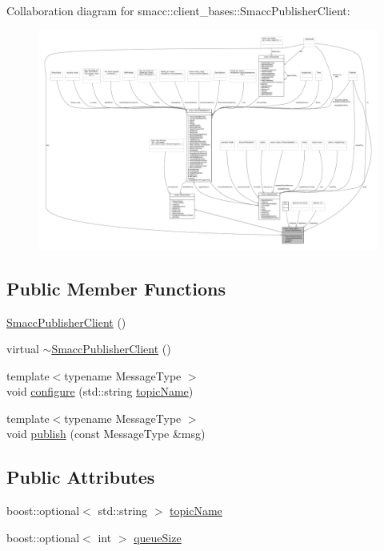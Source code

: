 Collaboration diagram for smacc\+:\+:client\+\_\+bases\+:\+:Smacc\+Publisher\+Client\+:\nopagebreak
\begin{figure}[H]
\begin{center}
\leavevmode
\includegraphics[width=350pt]{classsmacc_1_1client__bases_1_1SmaccPublisherClient__coll__graph}
\end{center}
\end{figure}
\subsection*{Public Member Functions}
\begin{DoxyCompactItemize}
\item 
\hyperlink{classsmacc_1_1client__bases_1_1SmaccPublisherClient_ac1713f185a2b81c6143a8fea042d53fa}{Smacc\+Publisher\+Client} ()
\item 
virtual \hyperlink{classsmacc_1_1client__bases_1_1SmaccPublisherClient_ad528f768a7b99560db514924f9cb789f}{$\sim$\+Smacc\+Publisher\+Client} ()
\item 
{\footnotesize template$<$typename Message\+Type $>$ }\\void \hyperlink{classsmacc_1_1client__bases_1_1SmaccPublisherClient_ade7a2549ada725b8342633137eb6ad53}{configure} (std\+::string \hyperlink{classsmacc_1_1client__bases_1_1SmaccPublisherClient_a8b8d98aef9b3b3a441005d2cb17b4fcc}{topic\+Name})
\item 
{\footnotesize template$<$typename Message\+Type $>$ }\\void \hyperlink{classsmacc_1_1client__bases_1_1SmaccPublisherClient_a083abb0f5c0f587f3381a58fe1fe3669}{publish} (const Message\+Type \&msg)
\end{DoxyCompactItemize}
\subsection*{Public Attributes}
\begin{DoxyCompactItemize}
\item 
boost\+::optional$<$ std\+::string $>$ \hyperlink{classsmacc_1_1client__bases_1_1SmaccPublisherClient_a8b8d98aef9b3b3a441005d2cb17b4fcc}{topic\+Name}
\item 
boost\+::optional$<$ int $>$ \hyperlink{classsmacc_1_1client__bases_1_1SmaccPublisherClient_a1a9b98681b01953f134191799a029fd3}{queue\+Size}
\end{DoxyCompactItemize}
